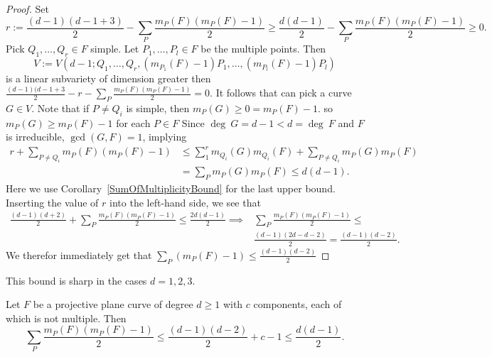      \begin{proof}
         Set
         $$r:= \frac{(d-1)(d-1+3)}{2}-\sum_P \frac{m_P(F)(m_P(F)-1)}{2}\geq \frac{d(d-1)}{2}-\sum_P \frac{m_P(F)(m_P(F)-1)}{2}\geq 0.$$
         Pick $Q_1,\dots,Q_r\in F$ simple. Let $P_1,\dots,P_l\in F$ be the multiple points. Then $$V:=V(d-1; Q_1,\dots,Q_r,(m_{P_1}(F)-1)P_1,\dots,(m_{P_l}(F)-1)P_l)$$
         is a linear subvariety of dimension greater then $\frac{(d-1)(d-1+3}{2}-r-\sum_P \frac{m_P(F)(m_P(F)-1)}{2} =0$. It follows that can pick a curve $G\in V$. Note that if $P\neq Q_i$ is simple, then $m_P(G)\geq 0 = m_P(F)-1$. so $m_P(G)\geq m_P(F)-1$ for each $P\in F$ Since $\deg \ G = d-1 < d=\deg \ F$ and $F$ is irreducible, $\gcd(G,F)=1$, implying 
         \begin{align*}
             r + \sum_{P\neq Q_i} m_P(F)(m_P(F)-1)  &\leq \sum_1^r m_{Q_i}(G)m_{Q_i}(F) +\sum_{P\neq Q_i} m_P(G)m_P(F) \\
             &= \sum_P m_P(G)m_P(F) \leq d(d-1).
         \end{align*}
         Here we use Corollary~\ref{SumOfMultiplicityBound} for the last upper bound. Inserting the value of $r$ into the left-hand side, we see that 
         \begin{align*}
            \frac{(d-1)(d+2)}{2}+ \sum_P \frac{m_P(F)(m_P(F)-1)}{2} \leq \frac{2d(d-1)}{2} \implies &\sum_P \frac{m_P(F)(m_P(F)-1)}{2} \leq\\
            &\frac{(d-1)(2d-d-2)}{2} = \frac{(d-1)(d-2)}{2}. 
         \end{align*}
         We therefor immediately get that $\sum_P (m_P(F)-1)\leq \frac{(d-1)(d-2)}{2}$
     \end{proof}
     \begin{remark}
         This bound is sharp in the cases $d=1,2,3$.
     \end{remark}
     \begin{proposition}
         Let $F$ be a projective plane curve of degree $d\geq 1$ with $c$ components, each of which is not multiple. Then
         $$\sum_P \frac{m_P(F)(m_P(F)-1)}{2}\leq \frac{(d-1)(d-2)}{2}+c-1\leq \frac{d(d-1)}{2}.$$
     \end{proposition}
